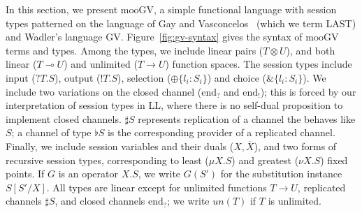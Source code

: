 \documentclass[orivec,envcountsame]{llncs}
\newcommand{\with}{\mathbin\binampersand}
\newcommand{\gvdual}[1]{\overline{#1}}
\newcommand{\gvout}[2]{{!#1.#2}}
\newcommand{\gvin}[2]{{?#1.#2}}
\newcommand{\lto}{\ensuremath{\multimap}}
\newcommand{\uto}{\ensuremath{\rightarrow}}
\newcommand{\outterm}{\mathrm{end}_!}
\newcommand{\interm}{\mathrm{end}_?}
\newcommand{\gvserver}[1]{\flat #1}
\newcommand{\gvservice}[1]{\sharp #1}
\newcommand{\mugv}{$\mathrm{mooGV}$\xspace}
\begin{document}
In this section, we present \mugv, a simple functional language with session types patterned on the
language of Gay and Vasconcelos~\cite{} (which we term LAST) and Wadler's language GV.
Figure~\ref{fig:gv-syntax} gives the syntax of \mugv terms and types.  Among the types, we include
linear pairs ($T \otimes U$), and both linear ($T \lto U$) and unlimited ($T \uto U$) function
spaces.  The session types include input ($\gvin{T}{S}$), output ($\gvout{T}{S}$), selection
($\oplus\{ l_i:S_i \}$) and choice ($\with\{l_i:S_i\}$).  We include two variations on the closed
channel ($\interm$ and $\outterm$); this is forced by our interpretation of session types in LL,
where there is no self-dual proposition to implement closed channels.  $\gvservice{S}$ represents
replication of a channel the behaves like $S$; a channel of type $\gvserver{S}$ is the corresponding
provider of a replicated channel.  Finally, we include session variables and their duals
($X,\gvdual{X}$), and two forms of recursive session types, corresponding to least ($\mu X.S$) and
greatest ($\nu X.S$) fixed points.  If $G$ is an operator $X.S$, we write $G(S')$ for the
substitution instance $S[S'/X]$.  All types are linear except for unlimited functions $T \uto U$,
replicated channels $\gvservice{S}$, and closed channels $\interm$; we write $un(T)$ if $T$ is
unlimited.
\end{document}
